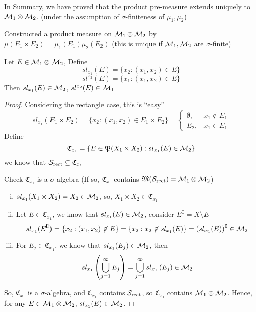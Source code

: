 \begin{remark}
  In Summary, we have proved that the product pre-measure extends uniquely to $\mathcal M_1 \otimes \mathcal M_2$. (under the assumption of $\sigma$-finiteness of $\mu_1, \mu_2$)
\end{remark}

\begin{remark}
  Constructed a product measure on $\mathcal M_1 \otimes \mathcal M_2$ by $\mu(E_1 \times E_2) = \mu_1(E_1)\mu_2(E_2)$
  (this is unique if $\mathcal M_1, \mathcal M_2$ are $\sigma$-finite)
\end{remark}

\begin{lemma}
  Let $E \in \mathcal M_1 \otimes \mathcal M_2$, Define  
  \[sl_{x_1}(E) = \{x_2: (x_1, x_2) \in E\}\]
  \[sl^{x_2}(E) = \{x_1 : (x_1, x_2) \in E\}\]
  Then $sl_{x_1}(E) \in \mathcal M_2$, $sl^{x_2}(E) \in \mathcal M_1$
\end{lemma}

\begin{proof}
  Considering the rectangle case, this is ``easy''
  \[sl_{x_1}(E_1 \times E_2) = \{x_2 : (x_1, x_2) \in E_1 \times E_2\} = \begin{cases}
    \emptyset, & x_1 \notin E_1\\
    E_2, & x_1 \in E_1
  \end{cases}\]
  Define
  \[\mathfrak{C}_{x_1} = \{E \in \mathfrak P(X_1 \times X_2) : sl_{x_1}(E) \in \mathcal M_2\}\]
  we know that $\mathcal S_{\text{rect}} \subseteq \mathfrak{C}_{x_1}$

  Check $\mathfrak{C}_{x_1}$ is a $\sigma$-algebra (If so, $\mathfrak{C}_{x_1}$ contains $\mathfrak M(\mathcal S_{\text{rect}}) = \mathcal M_1 \otimes \mathcal M_2$)
  \begin{enumerate}[(i)]
    \item $sl_{x_1}(X_1 \times X_2) = X_2 \in \mathcal M_2$, so, $X_1 \times X_2 \in \mathfrak{C}_{x_1}$
    \item Let $E \in \mathfrak{C}_{x_1}$, we know that $sl_{x_1}(E) \in \mathcal M_2$, consider $E^\complement = X \setminus E$  
  \[sl_{x_1}(E^\complement) = \{x_2 : (x_1, x_2) \not\in E\} = \{x_2 : x_2 \not\in sl_{x_1}(E)\} = (sl_{x_1}(E))^\complement \in \mathcal M_2\]
    \item For $E_j \in \mathfrak{C}_{x_1}$, we know that $sl_{x_1}(E_j) \in \mathcal M_2$, then
  \[sl_{x_1}\left(\bigcup_{j=1}^\infty E_j\right) = \bigcup_{j=1}^\infty sl_{x_1}\left( E_j\right) \in \mathcal M_2\]
  \end{enumerate}
  So, $\mathfrak{C}_{x_1}$ is a $\sigma$-algebra, and $\mathfrak{C}_{x_1}$ contains $\mathcal S_{\text{rect}}$, so $\mathfrak{C}_{x_1}$ contains $\mathcal M_1 \otimes \mathcal M_2$.
  Hence, for any $E \in \mathcal M_1 \otimes \mathcal M_2$, $sl_{x_1}(E) \in \mathcal M_2$.
\end{proof}

